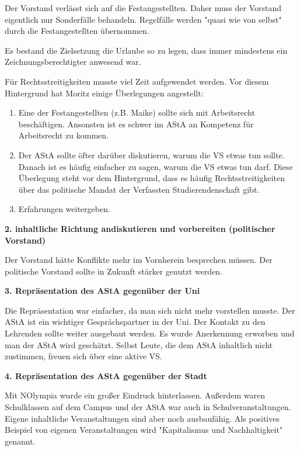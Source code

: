 \documentclass[ngerman,headheight=70pt]{scrartcl}
\begin{document}
    Der Vorstand verlässt sich auf die Festangestellten. Daher muss der Vorstand
    eigentlich nur Sonderfälle behandeln. Regelfälle werden "quasi wie von selbst"
    durch die Festangestellten übernommen.

    Es bestand die Zielsetzung die Urlaube so zu legen, dass immer mindestens ein
    Zeichnungsberechtigter anwesend war.

    Für Rechtsstreitigkeiten musste viel Zeit aufgewendet werden. Vor diesem
    Hintergrund hat Moritz einige Überlegungen angestellt:

    \begin{enumerate}
        \item Eine der Festangestellten (z.B. Maike) sollte sich mit
        Arbeitsrecht beschäftigen. Ansonsten ist es schwer im AStA an Kompetenz
        für Arbeitsrecht zu kommen.
        \item Der AStA sollte öfter darüber diskutieren, warum die VS etwas tun
        sollte. Danach ist es häufig einfacher zu sagen, warum die VS etwas tun
        darf. Diese Überlegung steht vor dem Hintergrund, dass es häufig
        Rechtsstreitigkeiten über das politische Mandat der Verfassten Studierendenschaft
        gibt.
        \item Erfahrungen weitergeben.
    \end{enumerate}

    \textbf{2. inhaltliche Richtung andiskutieren und vorbereiten (politischer
    Vorstand)}

    Der Vorstand hätte Konflikte mehr im Vornherein besprechen müssen.
    Der politische Vorstand sollte in Zukunft stärker genutzt werden.

    \textbf{3. Repräsentation des AStA gegenüber der Uni}

    Die Repräsentation war einfacher, da man sich nicht mehr vorstellen musste.
    Der AStA ist ein wichtiger Gesprächspartner in der Uni. Der Kontakt zu den
    Lehrenden sollte weiter ausgebaut werden. Es wurde Anerkennung erworben und
    man der AStA wird geschätzt. Selbst Leute, die dem AStA inhaltlich nicht
    zustimmen, freuen sich über eine aktive VS.

    \textbf{4. Repräsentation des AStA gegenüber der Stadt}

    Mit NOlympia wurde ein großer Eindruck hinterlassen. Außerdem waren
    Schulklassen auf dem Campus und der AStA war auch in Schulveranstaltungen.
    Eigene inhaltliche Veranstaltungen sind aber noch ausbaufähig.
    Als positives Beispiel von eigenen Veranstaltungen wird "Kapitalismus und
    Nachhaltigkeit" genannt.
\end{document}
